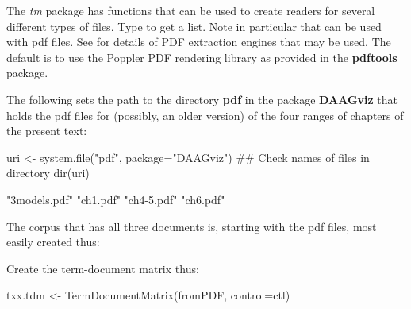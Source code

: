 The {\em tm} package has functions that can be used to create readers
for several different types of files.  Type  to get
a list.  Note in particular  that can be used with pdf
files.  See  for details of PDF extraction
engines that may be used.  The default is to use the Poppler PDF
rendering library as provided in the {\bf pdftools} package.

The following sets the path to the directory {\bf pdf} in the 
package {\bf DAAGviz} that holds the pdf files for (possibly,
an older version) of the four ranges of chapters of the present
text:
\begin{Schunk}
\begin{Sinput}
uri <- system.file("pdf", package="DAAGviz")
## Check names of files in directory
dir(uri)
\end{Sinput}
\begin{Soutput}
[1] "3models.pdf" "ch1.pdf"     "ch4-5.pdf"   "ch6.pdf"    
\end{Soutput}
\end{Schunk}

The corpus that has all three documents is, starting with the
pdf files, most easily created thus:
\begin{fullwidth}
\begin{Schunk}
\end{Schunk}
\end{fullwidth}

Create the term-document matrix thus:
\begin{Schunk}
\begin{Sinput}
txx.tdm <- TermDocumentMatrix(fromPDF, control=ctl)
\end{Sinput}
\end{Schunk}

